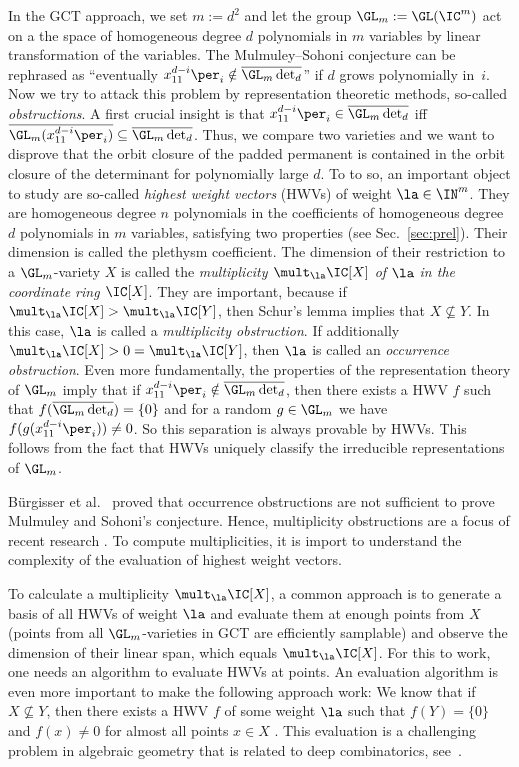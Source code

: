 In the GCT approach, we set $m:=d^2$ and let the group $\GL_{m}:=\GL(\IC^m)$ act on a the space of homogeneous degree $d$ polynomials in $m$ variables by linear transformation of the variables. The Mulmuley--Sohoni conjecture can
be rephrased as ``eventually $x_{11}^{d-i} \per_i \notin \overline{\GL_m \det_d}$'' if $d$ grows polynomially in~$i$. Now we try to attack this problem by representation theoretic methods, so-called \emph{obstructions}.
A first crucial insight is that $x_{11}^{d-i} \per_i \in \overline{\GL_m \det_d}$
iff
$\overline{\GL_m (x_{11}^{d-i} \per_i)} \subseteq \overline{\GL_m \det_d}$. Thus, we compare two varieties and we want to disprove that
the orbit closure of the padded permanent is contained in the orbit 
closure of the determinant for polynomially large $d$.
To to so, an important object to study are so-called \emph{highest weight vectors} (HWVs) of weight $\la \in \IN^m$.
They are homogeneous degree $n$ polynomials in the coefficients of homogeneous degree $d$ polynomials in $m$ variables, satisfying two properties (see Sec.~\ref{sec:prel}). Their dimension is called the plethysm coefficient. The dimension of their restriction to a $\GL_m$-variety $X$ is called the \emph{multiplicity $\mult_\la \IC[X]$ of $\la$ in the coordinate ring $\IC[X]$}. They are important, because if $\mult_\la \IC[X] > \mult_\la \IC[Y]$, then Schur's lemma implies that $X \not\subseteq Y$. In this case, $\la$ is called a \emph{multiplicity obstruction}.
If additionally $\mult_\la \IC[X] > 0 = \mult_\la \IC[Y]$, then $\la$ is called an \emph{occurrence obstruction}.
Even more fundamentally, the properties of the representation theory of $\GL_m$ imply that if $x_{11}^{d-i} \per_i \notin \overline{\GL_m \det_d}$, then there exists a HWV $f$ such that
$f(\overline{\GL_m \det_d})=\{0\}$
and for a random $g \in \GL_m$ we have $f(g(x_{11}^{d-i} \per_i)) \neq 0$.
So this separation is always provable by HWVs.
This follows from the fact that HWVs uniquely classify the irreducible representations of $\GL_m$.

B\"urgisser et al.~\cite{BIP:19} proved that occurrence obstructions are not sufficient to prove Mulmuley and Sohoni's conjecture.
Hence, multiplicity obstructions are a focus of recent research \cite{DBLP:conf/icalp/DorflerIP19, IK:19}. To compute multiplicities,
it is import to understand the complexity of the evaluation of highest weight vectors.  

To calculate a multiplicity $\mult_\la \IC[X]$, a common approach is to generate a basis of all HWVs of weight $\la$ and evaluate them at enough points from $X$ (points from all $\GL_m$-varieties in GCT are efficiently samplable) and observe the dimension of their linear span, which equals $\mult_\la \IC[X]$. For this to work, one needs an algorithm to evaluate HWVs at points.
An evaluation algorithm is even more important to make the following approach work:
We know that if $X \not\subseteq Y$, then there exists a HWV $f$ of some weight $\la$ such that $f(Y)=\{0\}$ and $f(x) \neq 0$ for almost all points $x \in X$ \cite[Cor.~11.4.2]{BI:17}.
This evaluation is a challenging problem in algebraic geometry that is related to deep combinatorics, see~\cite{LK:15, cheung2017symmetrizing, AIR:16}.



